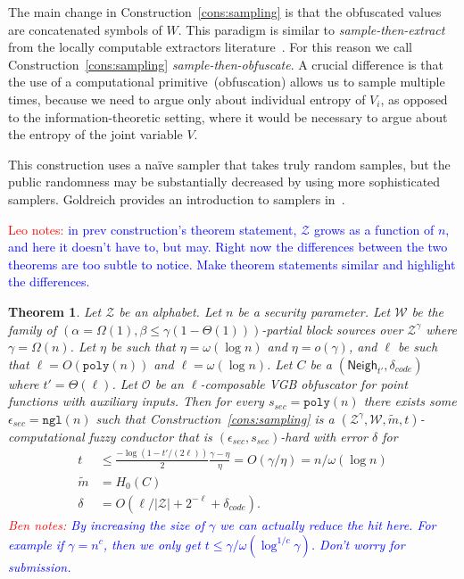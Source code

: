 \documentclass[11pt]{article}
\newcommand{\consref}[1]{\mbox{Construction~\ref{#1}}}
\newcommand{\class}[1]{{\ensuremath{\mathsf{#1}}}}
\newcommand{\neigh}{\ensuremath{\class{Neigh}}\xspace}
\newcommand{\poly}{\ensuremath{\mathtt{poly}}\xspace}
\newcommand{\ngl}{\ensuremath{\mathtt{ngl}}\xspace}
\newtheorem{theorem}{Theorem}[section]
\newcommand{\authnote}[2]{{\textcolor{red}{\textsf{#1 notes: }\textcolor{blue}{ #2}}\marginpar{\textcolor{red}{\textbf{!!!!!}}}}}
\newcommand{\authnote}[2]{}
\newcommand{\bnote}[1]{{\authnote{Ben}{#1}}}
\newcommand{\lnote}[1]{{\authnote{Leo}{#1}}}
\begin{document}
The main change in \consref{cons:sampling} is that the obfuscated values are concatenated symbols of $W$.  This paradigm is similar to \emph{sample-then-extract} from the locally computable extractors literature~\cite{lu2002hyper,vadhan2003constructing}.  For this reason we call \consref{cons:sampling} \emph{sample-then-obfuscate}.  A crucial difference is that the use of a computational primitive~(obfuscation) allows us to sample multiple times, because we need to argue only about individual entropy of $V_i$, as opposed to the information-theoretic setting, where it would be necessary to argue about the entropy of the joint variable $V$.

This construction uses a na\"{i}ve sampler that takes truly random samples, but the public randomness may be substantially decreased by using more sophisticated samplers. Goldreich provides an introduction to samplers in~\cite{goldreich2011sample}.

\lnote{in prev construction's theorem statement, $\mathcal{Z}$ grows as a function of $n$, and here it doesn't have to, but may. Right now the differences between the two theorems are too subtle to notice. Make theorem statements similar and highlight the differences.}
\begin{theorem}
\label{thm:sampling}
Let $\mathcal{Z}$ be an alphabet.
Let $n$ be a security parameter.
Let $\mathcal{W}$ be the family of $(\alpha = \Omega(1), \beta\leq \gamma(1-\Theta(1)))$-partial block sources over $\mathcal{Z}^\gamma$ where $\gamma = \Omega(n)$.   Let $\eta$ be such that $\eta = \omega(\log n)$ and $\eta = o(\gamma)$,  and $\ell$ be such that $\ell = O(\poly(n))$ and
$\ell = \omega(\log n)$.  Let $C$ be a $(\neigh_{t'}, \delta_{code})$ where $t' = \Theta(\ell)$.
Let $\mathcal{O}$ be an $\ell$-composable VGB obfuscator for point functions with auxiliary inputs.
  Then for every $s_{sec} = \poly(n)$ there exists some $\epsilon_{sec} = \ngl(n)$ such that \consref{cons:sampling} is a $(\mathcal{Z}^\gamma, \mathcal{W}, \tilde{m}, t)$-computational fuzzy conductor that is $(\epsilon_{sec}, s_{sec})$-hard with error $\delta$ for
\begin{align*}
t&\le \frac{-\log(1-t'/(2\ell))}{2}\frac{\gamma-\eta}{\eta}  = O(\gamma/\eta) = n /\omega(\log n)\\
\tilde{m} &=H_0(C)\\
\delta &= O(\ell/|\mathcal{Z}|+2^{-\ell} +\delta_{code}).
\end{align*}
\bnote{By increasing the size of $\gamma$ we can actually reduce the hit here.  For example if $\gamma = n^c$, then we only get $t \le \gamma / \omega(\log^{1/c} \gamma)$. Don't worry for submission.}
\end{theorem}
\end{document}
